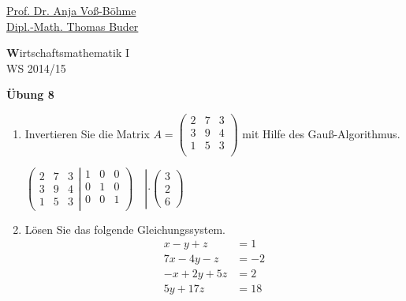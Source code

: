 \documentclass[12pt,a4paper]{scrreprt}
\newcommand{\Lsg}{\textbf{Lsg.:}}
\begin{document}
 
\begin{flushleft}
\href{mailto:anja.voss-boehme@htw-dresden.de}{Prof. Dr. Anja Voß-Böhme} \\
\href{mailto:buder@htw-dresden.de}{Dipl.-Math. Thomas Buder}
\end{flushleft}

\begin{center}{\large\textbf Wirtschaftsmathematik I} \\ WS 2014/15 \end{center}

\begin{center}{\large\textbf{Übung 8}} 
\end{center}


\bigskip
\begin{enumerate}
	\item Invertieren Sie die Matrix
$A=\begin{pmatrix}
 2 & 7 & 3\\
 3 & 9 & 4 \\
 1 & 5 & 3\\
\end{pmatrix}$ mit Hilfe des Gauß-Algorithmus.

$
\left(
\begin{matrix}
 2 & 7 & 3 \\
 3 & 9 & 4  \\
 1 & 5 & 3  
\end{matrix}
\left|
\begin{matrix}
1 & 0 & 0 \\
0 & 1 & 0 \\
0 & 0 & 1 \\
\end{matrix}
\right)
\right.
\hspace{1em} \left|\cdot\begin{pmatrix} 3 \\ 2 \\ 6 \end{pmatrix}\right.
$

	\item Lösen Sie das folgende Gleichungssystem.\begin{align*}
x - y +  z &= 1 \\
7x - 4y - z &= -2\\
-x + 2y + 5z &= 2\\
5y + 17z &= 18
\end{align*}


\end{enumerate}
\end{document}
